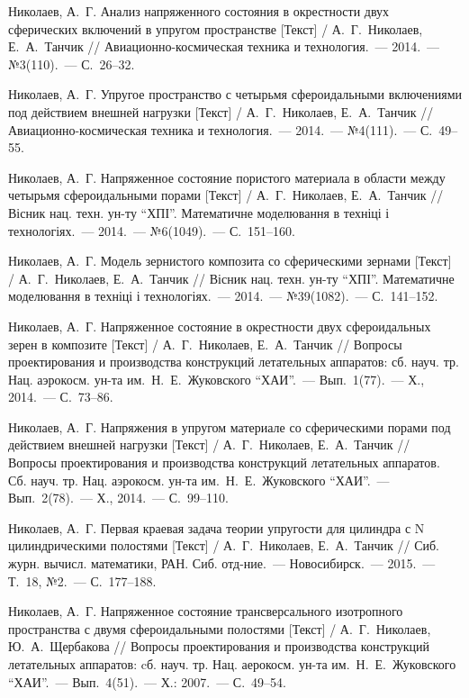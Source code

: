 \begin{biblist}{99}
Николаев, А.~Г. 
Анализ напряженного состояния в окрестности двух сферических включений в упругом пространстве [Текст] 
/ А.~Г.~Николаев, Е.~А.~Танчик 
// Авиационно-космическая техника и технология.~--- 2014.~--- №3(110).~--- С.~26--32.

Николаев, А.~Г. 
Упругое пространство с четырьмя сфероидальными включениями под действием внешней нагрузки [Текст] 
/ А.~Г.~Николаев, Е.~А.~Танчик 
// Авиационно-космическая техника и технология.~--- 2014.~--- №4(111).~--- С.~49--55.

Николаев, А.~Г. 
Напряженное состояние пористого материала в области между четырьмя сфероидальными порами [Текст] 
/ А.~Г.~Николаев, Е.~А.~Танчик 
// Вісник нац. техн. ун-ту ``ХПІ''. Математичне моделювання в техніці і технологіях.~--- 2014.~--- №6(1049).~--- С.~151--160.

Николаев, А.~Г. 
Модель зернистого композита со сферическими зернами [Текст] 
/ А.~Г.~Николаев, Е.~А.~Танчик 
// Вісник нац. техн. ун-ту ``ХПІ''. Математичне моделювання в техніці і технологіях.~--- 2014.~--- №39(1082).~--- С.~141--152.

Николаев, А.~Г. 
Напряженное состояние в окрестности двух сфероидальных зерен в композите [Текст] 
/ А.~Г.~Николаев, Е.~А.~Танчик 
// Вопросы проектирования и производства конструкций летательных аппаратов: сб. науч. тр. Нац. аэрокосм. ун-та им.~Н.~Е.~Жуковского ``ХАИ''.~--- Вып.~1(77).~--- Х., 2014.~--- С.~73--86.

Николаев, А.~Г. 
Напряжения в упругом материале со сферическими порами под действием внешней нагрузки [Текст] 
/ А.~Г.~Николаев, Е.~А.~Танчик 
// Вопросы проектирования и производства конструкций летательных аппаратов. Сб. науч. тр. Нац. аэрокосм. ун-та им.~Н.~Е.~Жуковского ``ХАИ''.~--- Вып.~2(78).~--- Х., 2014.~--- С.~99--110.

Николаев, А.~Г. 
Первая краевая задача теории упругости для цилиндра с N цилиндрическими полостями [Текст] 
/ А.~Г.~Николаев, Е.~А.~Танчик 
// Сиб. журн. вычисл. математики, РАН. Сиб. отд-ние.~--- Новосибирск.~--- 2015.~--- Т.~18, №2.~--- С.~177--188.

Николаев, А.~Г. 
Напряженное состояние  трансверсального изотропного пространства с двумя сфероидальными полостями [Текст] 
/ А.~Г.~Николаев, Ю.~А.~Щербакова 
// Вопросы проектирования и производства конструкций летательных аппаратов: cб. науч. тр. Нац. аерокосм. ун-та им.~Н.~Е.~Жуковского ``ХАИ''.~--- Вып.~4(51).~--- Х.: 2007.~--- С.~49--54.


\end{biblist}
